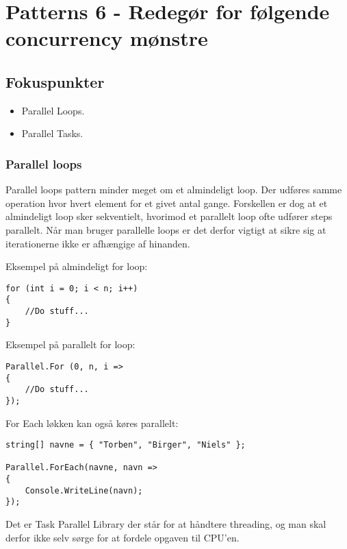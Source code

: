 \section{Patterns 6 - Redegør for følgende concurrency mønstre}

\subsection{Fokuspunkter}

\begin{itemize}
	\item Parallel Loops.
	\item Parallel Tasks.
\end{itemize}

\subsubsection{Parallel loops}

Parallel loops pattern minder meget om et almindeligt loop. Der udføres samme operation hvor hvert element for et givet antal gange. Forskellen er dog at et almindeligt loop sker sekventielt, hvorimod et parallelt loop ofte udfører steps parallelt. Når man bruger parallelle loops er det derfor vigtigt at sikre sig at iterationerne ikke er afhængige af hinanden.

Eksempel på almindeligt for loop:

\begin{lstlisting}[caption=Normal for loop, label=code:normalLoop]
for (int i = 0; i < n; i++)
{
	//Do stuff...
}
\end{lstlisting}

Eksempel på parallelt for loop:

\begin{lstlisting}[caption=Parallel for loop,  label=code:paraLoop,
morekeywords={Parallel, For}]
Parallel.For (0, n, i =>
{
	//Do stuff...
});
\end{lstlisting}

For Each løkken kan også køres parallelt:

\begin{lstlisting}[caption=Parallelt for each loop, label=paraForEach]
string[] navne = { "Torben", "Birger", "Niels" };

Parallel.ForEach(navne, navn =>
{
	Console.WriteLine(navn);
});
\end{lstlisting}

Det er Task Parallel Library der står for at håndtere threading, og man skal derfor ikke selv sørge for at fordele opgaven til CPU'en. 

